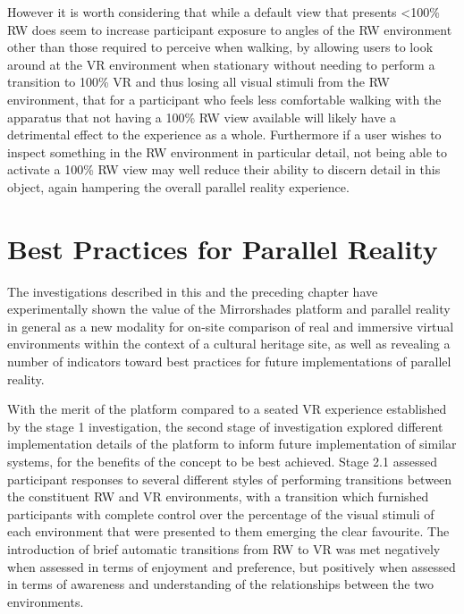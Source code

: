 However it is worth considering that while a default view that presents \textless 100\% RW does seem to increase participant exposure to angles of the RW environment other than those required to perceive when walking, by allowing users to look around at the VR environment when stationary without needing to perform a transition to 100\% VR and thus losing all visual stimuli from the RW environment, that for a participant who feels less comfortable walking with the apparatus that not having a 100\% RW view available will likely have a detrimental effect to the experience as a whole. Furthermore if a user wishes to inspect something in the RW environment in particular detail, not being able to activate a 100\% RW view may well reduce their ability to discern detail in this object, again hampering the overall parallel reality experience.


\section{Best Practices for Parallel Reality}

The investigations described in this and the preceding chapter have experimentally shown the value of the Mirrorshades platform and parallel reality in general as a new modality for on-site comparison of real and immersive virtual environments within the context of a cultural heritage site, as well as revealing a number of indicators toward best practices for future implementations of parallel reality.

With the merit of the platform compared to a seated VR experience established by the stage 1 investigation, the second stage of investigation explored different implementation details of the platform to inform future implementation of similar systems, for the benefits of the concept to be best achieved. Stage 2.1 assessed participant responses to several different styles of performing transitions between the constituent RW and VR environments, with a transition which furnished participants with complete control over the percentage of the visual stimuli of each environment that were presented to them emerging the clear favourite. The introduction of brief automatic transitions from RW to VR was met negatively when assessed in terms of enjoyment and preference, but positively when assessed in terms of awareness and understanding of the relationships between the two environments.

